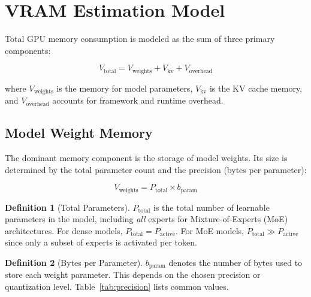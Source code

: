 \documentclass[11pt,a4paper]{article}
\theoremstyle{definition}
\newtheorem{definition}{Definition}[section]
\begin{document}
\section{VRAM Estimation Model}

Total GPU memory consumption is modeled as the sum of three primary components:

\begin{equation}\label{eq:total}
V_{\text{total}} = V_{\text{weights}} + V_{\text{kv}} + V_{\text{overhead}}
\end{equation}

where $V_{\text{weights}}$ is the memory for model parameters, $V_{\text{kv}}$ is the KV cache memory, and $V_{\text{overhead}}$ accounts for framework and runtime overhead.

\subsection{Model Weight Memory}

The dominant memory component is the storage of model weights. Its size is determined by the total parameter count and the precision (bytes per parameter):

\begin{equation}\label{eq:weights}
V_{\text{weights}} = P_{\text{total}} \times b_{\text{param}}
\end{equation}

\begin{definition}[Total Parameters]
$P_{\text{total}}$ is the total number of learnable parameters in the model, including \emph{all} experts for Mixture-of-Experts (MoE) architectures. For dense models, $P_{\text{total}} = P_{\text{active}}$. For MoE models, $P_{\text{total}} \gg P_{\text{active}}$ since only a subset of experts is activated per token.
\end{definition}

\begin{definition}[Bytes per Parameter]
$b_{\text{param}}$ denotes the number of bytes used to store each weight parameter. This depends on the chosen precision or quantization level. Table~\ref{tab:precision} lists common values.
\end{definition}
\end{document}
